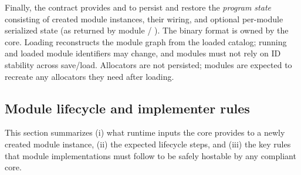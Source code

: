 Finally, the contract provides  and  to persist and restore the \emph{program state} consisting of created module instances, their wiring, and optional per-module serialized state (as returned by module  / ). The binary format is owned by the core. Loading reconstructs the module graph from the loaded catalog; running and loaded module identifiers may change, and modules must not rely on ID stability across save/load. Allocators are not persisted; modules are expected to recreate any allocators they need after loading.



\subsection{Module lifecycle and implementer rules} \label{subsec:ch3_module_rules}

This section summarizes (i) what runtime inputs the core provides to a newly created module instance, (ii) the expected lifecycle steps, and (iii) the key rules that module implementations must follow to be safely hostable by any compliant core.

